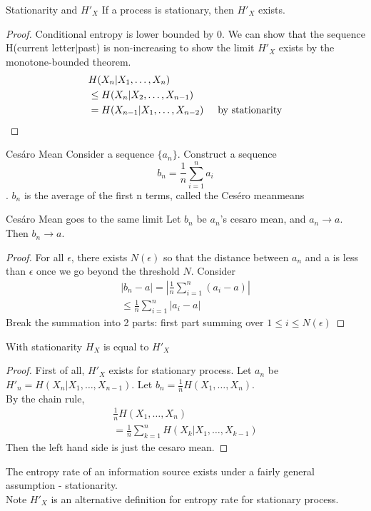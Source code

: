 \documentclass[../main.tex]{subfiles}
\begin{document}
 \begin{bbox}{Stationarity and $H'_X$}
     If a process is stationary, then $H'_X$ exists.
     \begin{proof}
         Conditional entropy is lower bounded by $0$. We can show that the sequence H(current letter$|$past) is non-increasing to show the limit $H'_X$ exists by the monotone-bounded theorem.
         \begin{align*}
             &H(X_n|X_1,\dots,X_n)\\
             &\leq H(X_n|X_2,\dots,X_{n-1})\\
             &=H(X_{n-1}|X_1,\dots,X_{n-2}) \hspace{5mm} \text{by stationarity}
         \end{align*}
     \end{proof}
 \end{bbox}
 \begin{gbox}{Cesáro Mean}
     Consider a sequence $\{a_n\}$. Construct a sequence \begin{equation*}
         b_n=\frac{1}{n}\sum_{i=1}^n a_i
     \end{equation*}.
     $b_n$ is the average of the first n terms, called the Ceséro meanmeans
 \end{gbox}
 \begin{bbox}{Cesáro Mean goes to the same limit}
     Let $b_n$ be $a_n$'s cesaro mean, and $a_n\to a$. Then $b_n\to a$.
     \begin{proof}
         For all $\epsilon$, there exists $N(\epsilon)$ so that the distance between $a_n$ and a is less than $\epsilon$ once we go beyond the threshold $N$. Consider \begin{align*}
             |b_n-a|=|\frac{1}{n}\sum_{i=1}^n (a_i-a)|\\
             \leq \frac{1}{n}\sum_{i=1}^n |a_i-a|
         \end{align*}
         Break the summation into 2 parts: first part summing over $1\leq i\leq N(\epsilon)$
     \end{proof}
 \end{bbox}
 
 \begin{bbox}{With stationarity $H_X$ is equal to $H'_X$}
     \begin{proof}
         First of all, $H'_X$ exists for stationary process.
         Let $a_n$ be $H'_n = H(X_n|X_1,\dots,X_{n-1})$. Let $b_n=\frac{1}{n}H(X_1,\dots,X_n)$.\\
         By the chain rule,
         \begin{align*}
             \frac{1}{n}H(X_1,\dots,X_n)\\
             =\frac{1}{n}\sum_{k=1}^n H(X_k|X_1,\dots,X_{k-1})
         \end{align*}
         Then the left hand side is just the cesaro mean.
     \end{proof}
 \end{bbox}
 The entropy rate of an information source exists under a fairly general assumption - stationarity.\\
 Note $H'_X$ is an alternative definition for entropy rate for stationary process.
 
\end{document}
